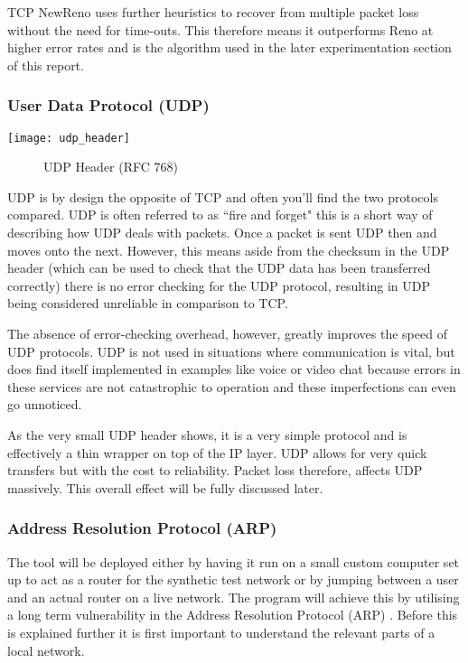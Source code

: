 TCP NewReno uses further heuristics to recover from multiple packet loss without the need for time-outs. This therefore means it outperforms Reno at higher error rates and is the algorithm used in the later experimentation section of this report.

\subsubsection{User Data Protocol (UDP)}
\begin{center}
	\texttt{[image: udp\_header]}
	\begin{figure}[h]
		\caption{UDP Header (RFC 768)}
	\end{figure}		
\end{center}

UDP is by design the opposite of TCP and often you'll find the two protocols compared. UDP is often referred to as ``fire and forget" \citep{kempf2011thoughts} this is a short way of describing how UDP deals with packets. Once a packet is sent UDP then and moves onto the next. However, this means aside from the checksum in the UDP header (which can be used to check that the UDP data has been transferred correctly) there is no error checking for the UDP protocol, resulting in UDP being considered unreliable in comparison to TCP. 

The absence of error-checking overhead, however, greatly improves the speed of UDP protocols. UDP is not used in situations where communication is vital, but does find itself implemented in examples like voice or video chat because errors in these services are not catastrophic to operation and these imperfections can even go unnoticed.

As the very small UDP header shows, it is a very simple protocol and is effectively a thin wrapper on top of the IP layer. UDP allows for very quick transfers but with the cost to reliability. Packet loss therefore, affects UDP massively. This overall effect will be fully discussed later.

\clearpage
\subsubsection{Address Resolution Protocol (ARP)}
\label{ref:arp_background}
The tool will be deployed either by having it run on a small custom computer set up to act as a router for the synthetic test network or by jumping between a user and an actual router on a live network. The program will achieve this by utilising a long term vulnerability in the Address Resolution Protocol (ARP) \citep{arp2001}. Before this is explained further it is first important to understand the relevant parts of a local network.

